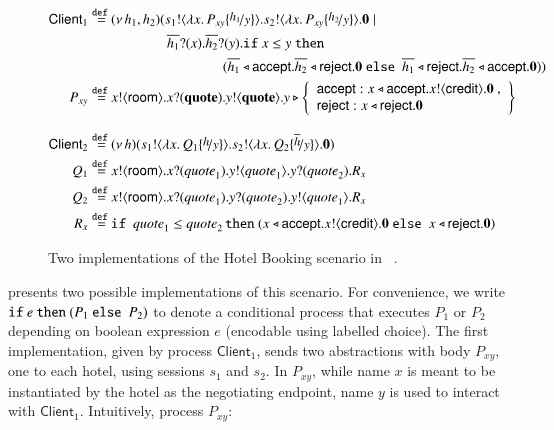 \documentclass[preprint,11pt]{elsarticle}
\newcommand{\rtype}{\mathsf{room}}
\newcommand{\Quotev}{\mathit{quote}}
\newcommand{\accept}{\mathsf{accept}}
\newcommand{\reject}{\mathsf{reject}}
\newcommand{\creditc}{\mathsf{credit}}
\newcommand{\Client}{\mathsf{Client}}
\begin{document}
{{%
\begin{figure}[t!]
	\begin{align*}%
		 \Client_1    \defeq  &  \newsp{h_1, h_2}{\bout{s_1}{\abs{x}{P_{xy} \subst{h_1}{y}}} \bout{s_2}{\abs{x}{P_{xy} \subst{h_2}{y}}} \inact \Par  \\
		 & 
		\qquad \qquad\binp{\dual{h_1}}{x} \binp{\dual{h_2}}{y}  \If x \leq y\   \Then
		\\
		 & \qquad\qquad \qquad \qquad (\bsel{\dual{h_1}}{\accept} \bsel{\dual{h_2}}{\reject} \inact \ \Else \ \bsel{\dual{h_1}}{\reject} \bsel{\dual{h_2}}{\accept} \inact )
		}
		\\
				 P_{xy}     \defeq &    \bout{x}{\rtype} \binp{x}{\Quotev} \bout{y}{\Quotev}
		y \triangleright \left\{
				\begin{array}{l}
					\accept: \bsel{x}{\accept} \bout{x}{\creditc} \inact~,\\
					\reject: \bsel{x}{\reject} \inact
				\end{array}
				\right\}
				\\[3mm]
						\Client_2 \defeq& \newsp{h}{\bout{s_1}{\abs{x}{Q_1 \subst{h}{y}}} \bout{s_2}{\abs{x}{Q_2 \subst{\dual{h}}{y}}} \inact}
\\
		Q_1 \defeq&	\bout{x}{\rtype} \binp{x}{\Quotev_1} \bout{y}{\Quotev_1} \binp{y}{\Quotev_2} R_x \\
		Q_2 \defeq&	\bout{x}{\rtype} \binp{x}{\Quotev_1} \binp{y}{\Quotev_2} \bout{y}{\Quotev_1} R_x \\
			    R_x  \defeq & \If\ \Quotev_1 \leq \Quotev_2 \, \Then  (\bsel{x}{\accept} \bout{x}{\creditc} \inact \  \Else \ \bsel{x}{\reject} \inact)
	\end{align*}
	\caption{Two implementations of the Hotel Booking scenario in \HOp~\cite{KouzapasPY17}.}\label{f:hotel}
	\end{figure}
%
 presents
two possible \HOp implementations of this scenario.
For convenience, we write 
$\mathtt{if}\  e\ \mathtt{then}\  (P_1\ \mathtt{else}\  \ P_2)$
to denote a conditional process that executes $P_1$ or $P_2$ depending on boolean expression $e$ (encodable using labelled choice).
The {first implementation}, given by 
process $\Client_1$, sends two abstractions with body $P_{xy}$, one to each hotel, 
		using sessions $s_1$ and $s_2$.
		In $P_{xy}$, %
	while
		name $x$ is meant to be instantiated by the hotel as the negotiating
		endpoint, name $y$ is used to interact with $\Client_1$.	
		Intuitively, process $P_{xy}$:
}}
\end{document}
